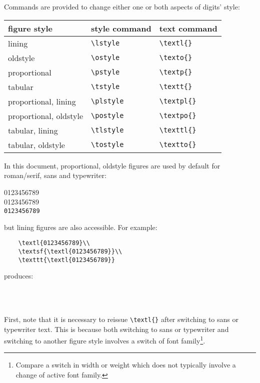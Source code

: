 \documentclass[11pt,british,a4paper]{article}
\begin{document}
Commands are provided to change either one or both aspects of digits' style:
	\begin{longtable}{lll}
		\toprule
		\textbf{figure style}			&	\textbf{style command}	&	\textbf{text command}\\\midrule\endhead
		\bottomrule\endfoot
		lining										&	\verb|\lstyle|						&	\verb|\textl{}|\\
		oldstyle									&	\verb|\ostyle|						&	\verb|\texto{}|\\
		proportional							&	\verb|\pstyle|						&	\verb|\textp{}|\\
		tabular									&	\verb|\tstyle|						&	\verb|\textt{}|\\
		proportional, lining				&	\verb|\plstyle|						&	\verb|\textpl{}|\\
		proportional, oldstyle			&	\verb|\postyle|					&	\verb|\textpo{}|\\
		tabular, lining						&	\verb|\tlstyle|						&	\verb|\texttl{}|\\
		tabular, oldstyle					&	\verb|\tostyle|					&	\verb|\textto{}|
	\end{longtable}

In this document, proportional, oldstyle figures are used by default for roman/serif, sans and typewriter:
		\begin{center}
			0123456789\\
			\textsc{0123456789}\\
			\texttt{0123456789}
		\end{center}
but lining figures are also accessible. For example:
\begin{verbatim}
	\textl{0123456789}\\
	\textsf{\textl{0123456789}}\\
	\texttt{\textl{0123456789}}
\end{verbatim}
produces:
		\begin{center}
			\\
			\textsf{}\\
			\texttt{}
		\end{center}
First, note that it is necessary to reissue \verb|\textl{}| after switching to sans or typewriter text. This is because both switching to sans or typewriter and switching to another figure style involves a switch of font family\footnote{Compare a switch in width or weight which does not typically involve a change of active font family.}.
\end{document}
